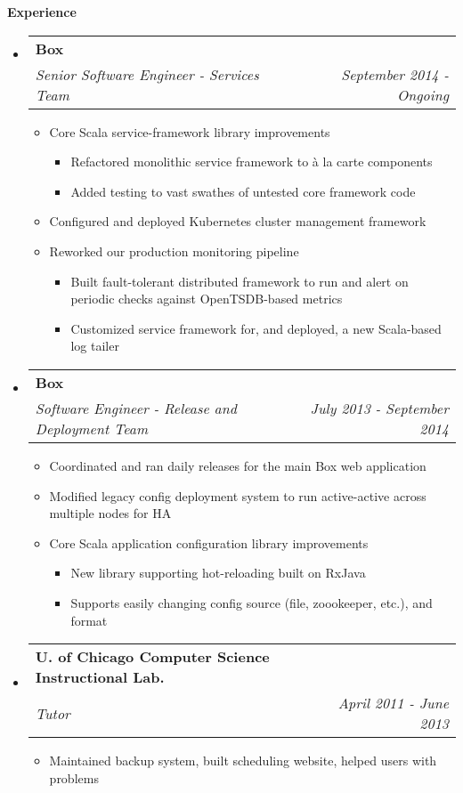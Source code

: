 \documentclass[letterpaper,11pt]{article}
\makeatletter
\newcommand{\resitem}[1]{\item #1 \vspace{-2pt}}
\newcommand{\resheading}[1]{{\large {\textbf{#1 \vphantom{p\^{E}}}}}}
\newcommand{\ressubheading}[4]{
  \begin{tabular*}{6.5in}{l@{\extracolsep{\fill}}r}
    \textbf{#1} & #2 \\
    \textit{#3} & \textit{#4} \\
  \end{tabular*}\vspace{-6pt}}
\makeatother
\begin{document}
\resheading{Experience}
\begin{itemize}
\item[]
  \ressubheading{Box}{}{Senior Software Engineer - Services Team}{September 2014 - Ongoing}
  \begin{itemize}
    \resitem{Core Scala service-framework library improvements}
    \begin{itemize}
      \resitem{Refactored monolithic service framework to \`{a} la carte components}
      \resitem{Added testing to vast swathes of untested core framework code}
    \end{itemize}
    \resitem{Configured and deployed Kubernetes cluster management framework}
    \resitem{Reworked our production monitoring pipeline}
    \begin{itemize}
      \resitem{Built fault-tolerant distributed framework to run and alert on periodic checks against OpenTSDB-based metrics}
      \resitem{Customized service framework for, and deployed, a new Scala-based log tailer}
    \end{itemize}
  \end{itemize}
\item[]
  \ressubheading{Box}{}{Software Engineer - Release and Deployment Team}{July 2013 - September 2014}
  \begin{itemize}
    \resitem{Coordinated and ran daily releases for the main Box web application}
    \resitem{Modified legacy config deployment system to run active-active across multiple nodes for HA}
    \resitem{Core Scala application configuration library improvements}
    \begin{itemize}
      \resitem{New library supporting hot-reloading built on RxJava}
      \resitem{Supports easily changing config source (file, zoookeeper, etc.), and format}
    \end{itemize}
  \end{itemize}
\item[]
  \ressubheading{U. of Chicago Computer Science Instructional Lab.}{}{Tutor}{April 2011 - June 2013}
  \begin{itemize}
    \resitem{Maintained backup system, built scheduling website, helped users with problems}
  \end{itemize}
  
\end{itemize}
\end{document}
